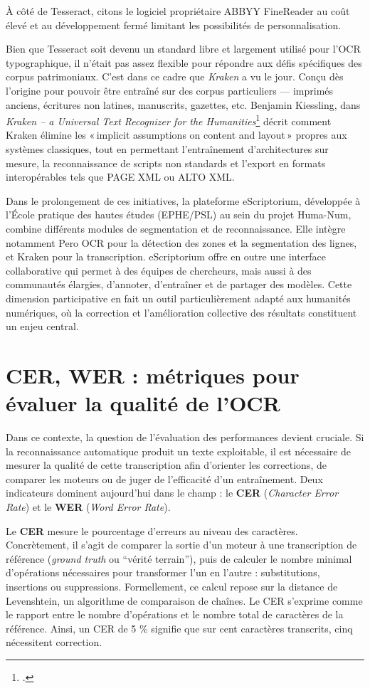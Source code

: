 À côté de Tesseract, citons le logiciel propriétaire ABBYY FineReader au coût élevé et au développement fermé limitant les possibilités de personnalisation.

Bien que Tesseract soit devenu un standard libre et largement utilisé pour l’OCR typographique, il n’était pas assez flexible pour répondre aux défis spécifiques des corpus patrimoniaux. C’est dans ce cadre que \emph{Kraken} a vu le jour. Conçu dès l’origine pour pouvoir être entraîné sur des corpus particuliers — imprimés anciens, écritures non latines, manuscrits, gazettes, etc. Benjamin Kiessling, dans \emph{Kraken – a Universal Text Recognizer for the Humanities}\footcite[][]{kiessling} décrit comment Kraken élimine les « implicit assumptions on content and layout » propres aux systèmes classiques, tout en permettant l’entraînement d’architectures sur mesure, la reconnaissance de scripts non standards et l’export en formats interopérables tels que PAGE XML ou ALTO XML.

Dans le prolongement de ces initiatives, la plateforme eScriptorium, développée à l’École pratique des hautes études (EPHE/PSL) au sein du projet Huma-Num, combine différents modules de segmentation et de reconnaissance. Elle intègre notamment Pero OCR pour la détection des zones et la segmentation des lignes, et Kraken pour la transcription. eScriptorium offre en outre une interface collaborative qui permet à des équipes de chercheurs, mais aussi à des communautés élargies, d’annoter, d’entraîner et de partager des modèles. Cette dimension participative en fait un outil particulièrement adapté aux humanités numériques, où la correction et l’amélioration collective des résultats constituent un enjeu central.

\section{CER, WER : métriques pour évaluer la qualité de l'OCR}

Dans ce contexte, la question de l’évaluation des performances devient cruciale. Si la reconnaissance automatique produit un texte exploitable, il est nécessaire de mesurer la qualité de cette transcription afin d’orienter les corrections, de comparer les moteurs ou de juger de l’efficacité d’un entraînement. Deux indicateurs dominent aujourd’hui dans le champ : le \textbf{CER} (\emph{Character Error Rate}) et le \textbf{WER} (\emph{Word Error Rate}).

Le \textbf{CER} mesure le pourcentage d’erreurs au niveau des caractères. Concrètement, il s’agit de comparer la sortie d’un moteur à une transcription de référence (\emph{ground truth} ou \enquote{vérité terrain}), puis de calculer le nombre minimal d’opérations nécessaires pour transformer l’un en l’autre : substitutions, insertions ou suppressions. Formellement, ce calcul repose sur la distance de Levenshtein, un algorithme de comparaison de chaînes. Le CER s’exprime comme le rapport entre le nombre d’opérations et le nombre total de caractères de la référence. Ainsi, un CER de 5 \% signifie que sur cent caractères transcrits, cinq nécessitent correction.

